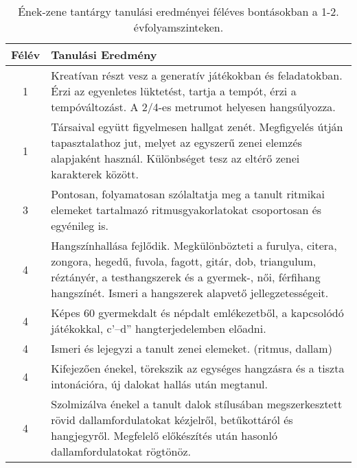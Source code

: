        
           \begin{longtable}{c | p{} }
            \caption[Ének-zene 1-2.]{Ének-zene tantárgy tanulási eredményei féléves bontásokban a 1-2. évfolyamszinteken. }  \\

            \textbf{Félév} & \textbf{Tanulási Eredmény} \\
            \hline
            \endhead
                                
                                          1 &  Kreatívan részt vesz a generatív játékokban és feladatokban. Érzi az egyenletes lüktetést, tartja a tempót, érzi a tempóváltozást. A 2/4-es metrumot helyesen hangsúlyozza. \\ \hline
                                          1 &  Társaival együtt figyelmesen hallgat zenét. Megfigyelés útján tapasztalathoz jut, melyet az egyszerű zenei elemzés alapjaként használ. Különbséget tesz az eltérő zenei karakterek között. \\ \hline
                                      
                                
                                          3 &  Pontosan, folyamatosan szólaltatja meg a tanult ritmikai elemeket tartalmazó ritmusgyakorlatokat csoportosan és egyénileg is. \\ \hline
                                      
                                
                                          4 &  Hangszínhallása fejlődik. Megkülönbözteti a furulya, citera, zongora, hegedű, fuvola, fagott, gitár, dob, triangulum, réztányér, a testhangszerek és a gyermek-, női, férfihang hangszínét. Ismeri a hangszerek alapvető jellegzetességeit. \\ \hline
                                          4 &  Képes 60 gyermekdalt és népdalt emlékezetből, a kapcsolódó játékokkal, c’–d” hangterjedelemben előadni. \\ \hline
                                          4 &  Ismeri és lejegyzi a tanult zenei elemeket. (ritmus, dallam) \\ \hline
                                          4 &  Kifejezően énekel, törekszik az egységes hangzásra és a tiszta intonációra, új dalokat hallás után megtanul. \\ \hline
                                          4 &  Szolmizálva énekel a tanult dalok stílusában megszerkesztett rövid dallamfordulatokat kézjelről, betűkottáról és hangjegyről. Megfelelő előkészítés után hasonló dallamfordulatokat rögtönöz. \\ \hline
                                      
                        \end{longtable}
            \clearpage

